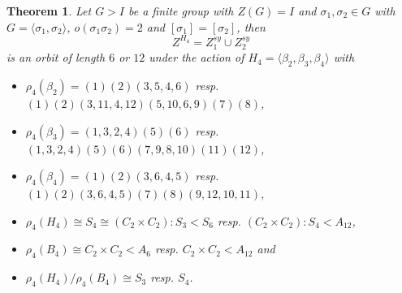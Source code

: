 \documentclass[12pt,a4paper]{article}
\newtheorem{theorem}{Theorem}[section]
\numberwithin{equation}{section}
\numberwithin{table}{section}
\begin{document}
\begin{theorem}
\label{BraidOrbitsOfSize12}
Let $G>I$ be a finite group with $Z(G)=I$ and $\sigma_1, \sigma_2 \in G$ with
$G=\langle \sigma_1, \sigma_2 \rangle$, $o(\sigma_1 \sigma_2)=2$ and $[\sigma_1]=[\sigma_2]$, then
$$Z^{H_4} = Z^{sy}_1 \cup Z^{sy}_2$$
is an orbit of length $6$ or $12$ under the action of $H_4 = \langle \beta_2, \beta_3, \beta_4 \rangle$ with
\begin{itemize}
\item[]
$\rho_4(\beta_2)=(1)(2)(3,5,4,6)$ resp. $(1)(2)(3,11,4,12)(5,10,6,9)(7)(8)$,
\item[]
$\rho_4(\beta_3)=(1,3,2,4)(5)(6)$ resp. $(1,3,2,4)(5)(6)(7,9,8,10)(11)(12)$,
\item[]
$\rho_4(\beta_4)=(1)(2)(3,6,4,5)$ resp. $(1)(2)(3,6,4,5)(7)(8)(9,12,10,11)$,
\item[]
$\rho_4(H_4) \cong S_4 \cong (C_2 \times C_2):S_3 < S_6$ resp. $(C_2 \times C_2):S_4 < A_{12}$,
\item[]
$\rho_4(B_4) \cong C_2 \times C_2 < A_6$ resp. $C_2 \times C_2 < A_{12}$ and
\item[]
$\rho_4(H_4)/\rho_4(B_4) \cong S_3$ resp. $S_4$.
\end{itemize}
\end{theorem}
\end{document}
